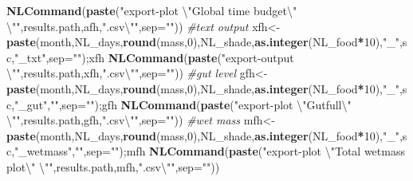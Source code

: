 \documentclass[]{article}
\newenvironment{Shaded}{\begin{snugshade}}{\end{snugshade}}
\newcommand{\KeywordTok}[1]{\textcolor[rgb]{0.13,0.29,0.53}{\textbf{#1}}}
\newcommand{\DataTypeTok}[1]{\textcolor[rgb]{0.13,0.29,0.53}{#1}}
\newcommand{\DecValTok}[1]{\textcolor[rgb]{0.00,0.00,0.81}{#1}}
\newcommand{\CharTok}[1]{\textcolor[rgb]{0.31,0.60,0.02}{#1}}
\newcommand{\StringTok}[1]{\textcolor[rgb]{0.31,0.60,0.02}{#1}}
\newcommand{\CommentTok}[1]{\textcolor[rgb]{0.56,0.35,0.01}{\textit{#1}}}
\newcommand{\OperatorTok}[1]{\textcolor[rgb]{0.81,0.36,0.00}{\textbf{#1}}}
\newcommand{\NormalTok}[1]{#1}
\begin{document}
\begin{Shaded}
\begin{Highlighting}[]
        \KeywordTok{NLCommand}\NormalTok{(}\KeywordTok{paste}\NormalTok{(}\StringTok{"export-plot }\CharTok{\textbackslash{}"}\StringTok{Global time budget}\CharTok{\textbackslash{}"}\StringTok{ }\CharTok{\textbackslash{}"}\StringTok{"}\NormalTok{,results.path,afh,}\StringTok{".csv}\CharTok{\textbackslash{}"}\StringTok{"}\NormalTok{,}\DataTypeTok{sep=}\StringTok{""}\NormalTok{))}
        \CommentTok{#text output}
\NormalTok{        xfh<-}\KeywordTok{paste}\NormalTok{(month,NL_days,}\KeywordTok{round}\NormalTok{(mass,}\DecValTok{0}\NormalTok{),NL_shade,}\KeywordTok{as.integer}\NormalTok{(NL_food}\OperatorTok{*}\DecValTok{10}\NormalTok{),}\StringTok{"_"}\NormalTok{,sc,}\StringTok{"_txt"}\NormalTok{,}\DataTypeTok{sep=}\StringTok{""}\NormalTok{);xfh}
        \KeywordTok{NLCommand}\NormalTok{(}\KeywordTok{paste}\NormalTok{(}\StringTok{"export-output }\CharTok{\textbackslash{}"}\StringTok{"}\NormalTok{,results.path,xfh,}\StringTok{".csv}\CharTok{\textbackslash{}"}\StringTok{"}\NormalTok{,}\DataTypeTok{sep=}\StringTok{""}\NormalTok{))}
        \CommentTok{#gut level}
\NormalTok{        gfh<-}\KeywordTok{paste}\NormalTok{(month,NL_days,}\KeywordTok{round}\NormalTok{(mass,}\DecValTok{0}\NormalTok{),NL_shade,}\KeywordTok{as.integer}\NormalTok{(NL_food}\OperatorTok{*}\DecValTok{10}\NormalTok{),}\StringTok{"_"}\NormalTok{,sc,}\StringTok{"_gut"}\NormalTok{,}\StringTok{""}\NormalTok{,}\DataTypeTok{sep=}\StringTok{""}\NormalTok{);gfh}
        \KeywordTok{NLCommand}\NormalTok{(}\KeywordTok{paste}\NormalTok{(}\StringTok{"export-plot }\CharTok{\textbackslash{}"}\StringTok{Gutfull}\CharTok{\textbackslash{}"}\StringTok{ }\CharTok{\textbackslash{}"}\StringTok{"}\NormalTok{,results.path,gfh,}\StringTok{".csv}\CharTok{\textbackslash{}"}\StringTok{"}\NormalTok{,}\DataTypeTok{sep=}\StringTok{""}\NormalTok{))}
        \CommentTok{#wet mass }
\NormalTok{        mfh<-}\KeywordTok{paste}\NormalTok{(month,NL_days,}\KeywordTok{round}\NormalTok{(mass,}\DecValTok{0}\NormalTok{),NL_shade,}\KeywordTok{as.integer}\NormalTok{(NL_food}\OperatorTok{*}\DecValTok{10}\NormalTok{),}\StringTok{"_"}\NormalTok{,sc,}\StringTok{"_wetmass"}\NormalTok{,}\StringTok{""}\NormalTok{,}\DataTypeTok{sep=}\StringTok{""}\NormalTok{);mfh}
        \KeywordTok{NLCommand}\NormalTok{(}\KeywordTok{paste}\NormalTok{(}\StringTok{"export-plot }\CharTok{\textbackslash{}"}\StringTok{Total wetmass plot}\CharTok{\textbackslash{}"}\StringTok{ }\CharTok{\textbackslash{}"}\StringTok{"}\NormalTok{,results.path,mfh,}\StringTok{".csv}\CharTok{\textbackslash{}"}\StringTok{"}\NormalTok{,}\DataTypeTok{sep=}\StringTok{""}\NormalTok{))}

\end{Highlighting}
\end{Shaded}
\end{document}
